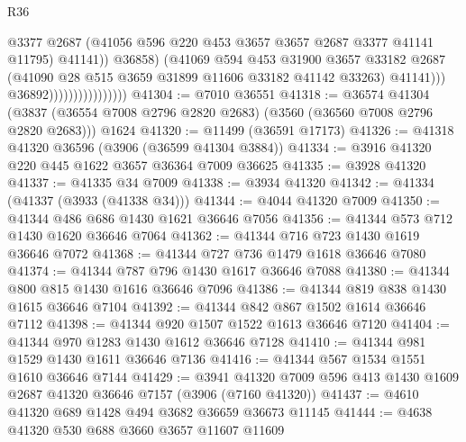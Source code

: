 \begin{lexlean}{R36}
\begin{coremodule}
                                              @3377
                                              @2687
                                              (@41056
                                                @596
                                                @220
                                                @453
                                                @3657
                                                @3657
                                                @2687
                                                @3377
                                                @41141
                                                @11795)
                                              @41141))
                                          @36858)
                                        (@41069
                                          @594
                                          @453
                                          @31900
                                          @3657
                                          @33182
                                          @2687
                                          (@41090 @28 @515 @3659 @31899 @11606 @33182 @41142 @33263)
                                          @41141)))
                                    @36892))))))))))))))))
@41304 := @7010 @36551
@41318 := @36574
    @41304
    (@3837 (@36554 @7008 @2796 @2820 @2683) (@3560 (@36560 @7008 @2796 @2820 @2683)))
    @1624
@41320 := @11499 (@36591 @17173)
@41326 := @41318 @41320 @36596 (@3906 (@36599 @41304 @3884))
@41334 := @3916 @41320 @220 @445 @1622 @3657 @36364 @7009 @36625
@41335 := @3928 @41320
@41337 := @41335 @34 @7009
@41338 := @3934 @41320
@41342 := @41334 (@41337 (@3933 (@41338 @34)))
@41344 := @4044 @41320 @7009
@41350 := @41344 @486 @686 @1430 @1621 @36646 @7056
@41356 := @41344 @573 @712 @1430 @1620 @36646 @7064
@41362 := @41344 @716 @723 @1430 @1619 @36646 @7072
@41368 := @41344 @727 @736 @1479 @1618 @36646 @7080
@41374 := @41344 @787 @796 @1430 @1617 @36646 @7088
@41380 := @41344 @800 @815 @1430 @1616 @36646 @7096
@41386 := @41344 @819 @838 @1430 @1615 @36646 @7104
@41392 := @41344 @842 @867 @1502 @1614 @36646 @7112
@41398 := @41344 @920 @1507 @1522 @1613 @36646 @7120
@41404 := @41344 @970 @1283 @1430 @1612 @36646 @7128
@41410 := @41344 @981 @1529 @1430 @1611 @36646 @7136
@41416 := @41344 @567 @1534 @1551 @1610 @36646 @7144
@41429 := @3941 @41320 @7009 @596 @413 @1430 @1609 @2687 @41320 @36646 @7157 (@3906 (@7160 @41320))
@41437 := @4610 @41320 @689 @1428 @494 @3682 @36659 @36673 @11145
@41444 := @4638 @41320 @530 @688 @3660 @3657 @11607 @11609

\end{coremodule}
\end{lexlean}
